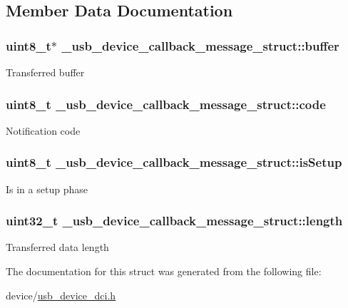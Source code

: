 \subsection{Member Data Documentation}
\hypertarget{struct__usb__device__callback__message__struct_adff2b0d4cadc686699c367705b7127f6}{
\subsubsection[{buffer}]{\setlength{\rightskip}{0pt plus 5cm}uint8\-\_\-t$\ast$ \-\_\-usb\-\_\-device\-\_\-callback\-\_\-message\-\_\-struct\-::buffer}}\label{struct__usb__device__callback__message__struct_adff2b0d4cadc686699c367705b7127f6}
Transferred buffer \hypertarget{struct__usb__device__callback__message__struct_ada4df9e2414e192bfd8c4d27fe1596ee}{
\subsubsection[{code}]{\setlength{\rightskip}{0pt plus 5cm}uint8\-\_\-t \-\_\-usb\-\_\-device\-\_\-callback\-\_\-message\-\_\-struct\-::code}}\label{struct__usb__device__callback__message__struct_ada4df9e2414e192bfd8c4d27fe1596ee}
Notification code \hypertarget{struct__usb__device__callback__message__struct_a241d466ac120fe60cad47ca2c84e5a29}{
\subsubsection[{is\-Setup}]{\setlength{\rightskip}{0pt plus 5cm}uint8\-\_\-t \-\_\-usb\-\_\-device\-\_\-callback\-\_\-message\-\_\-struct\-::is\-Setup}}\label{struct__usb__device__callback__message__struct_a241d466ac120fe60cad47ca2c84e5a29}
Is in a setup phase \hypertarget{struct__usb__device__callback__message__struct_aae817b0dc7d1f8394024910412caba31}{
\subsubsection[{length}]{\setlength{\rightskip}{0pt plus 5cm}uint32\-\_\-t \-\_\-usb\-\_\-device\-\_\-callback\-\_\-message\-\_\-struct\-::length}}\label{struct__usb__device__callback__message__struct_aae817b0dc7d1f8394024910412caba31}
Transferred data length 

The documentation for this struct was generated from the following file\-:\begin{DoxyCompactItemize}
\item 
device/\hyperlink{usb__device__dci_8h}{usb\-\_\-device\-\_\-dci.\-h}\end{DoxyCompactItemize}
